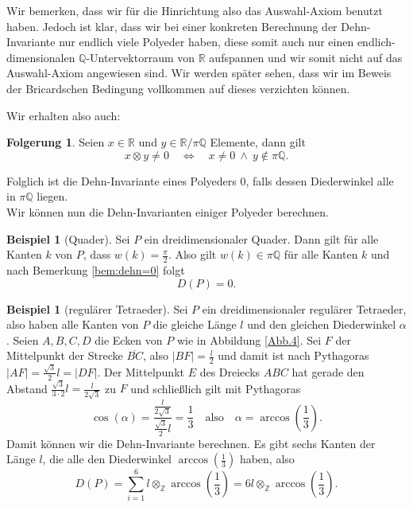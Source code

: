 \documentclass[11pt,titlepage]{article}
\newcommand{\setZ}{\mathbb{Z}}
\newcommand{\setQ}{\mathbb{Q}}
\newcommand{\setR}{\mathbb{R}}
\theoremstyle{definition}
\newtheorem{corollary}[theorem]{Folgerung}
\newtheorem{example}[theorem]{Beispiel}
\theoremstyle{remark}
\begin{document}
	Wir bemerken, dass wir für die Hinrichtung also das Auswahl-Axiom 
	benutzt haben. Jedoch ist klar, dass wir bei einer konkreten Berechnung der 
	Dehn-Invariante nur endlich viele Polyeder haben, diese somit auch 
	nur einen endlich-dimensionalen $\setQ$-Untervektorraum von $\setR$ aufspannen und wir somit nicht auf das Auswahl-Axiom angewiesen sind. Wir 
	werden später sehen, dass wir im Beweis der Bricardschen Bedingung 
	vollkommen auf dieses verzichten können.
	
	Wir erhalten also auch:
	
	\begin{corollary}
		Seien $x\in\setR$ und $y\in\setR/\pi\setQ$ Elemente, dann gilt
		\[ x\otimes y\neq0\quad\Leftrightarrow\quad x\neq 0 \ \land\ y\notin\pi\setQ. \]
	\end{corollary}
	
	Folglich ist die Dehn-Invariante eines Polyeders $0$, falls dessen Diederwinkel alle in $\pi\setQ$ liegen. \\
	
	Wir können nun die Dehn-Invarianten einiger Polyeder berechnen.
	
	\begin{example}[Quader] \label{exp:quader}
		Sei $P$ ein dreidimensionaler Quader. Dann gilt für alle Kanten $k$ von $P$, dass $w(k)=\frac{\pi}{2}$. 
		Also gilt $w(k)\in \pi\setQ$ für alle Kanten $k$ und nach Bemerkung \ref{bem:dehn=0} folgt
		\[ D(P)=0. \]
	\end{example}
	
	\begin{example}[regulärer Tetraeder] \label{exp:regTetr}
		Sei $P$ ein dreidimensionaler regulärer Tetraeder, also haben alle Kanten von $P$ die gleiche Länge $l$ und 
		den gleichen Diederwinkel $\alpha$. Seien $A,B,C,D$ die Ecken von $P$ wie in Abbildung \ref{Abb.4}. 
		Sei $F$ der Mittelpunkt der Strecke $\overline{BC}$, also $|BF|=\frac{l}{2}$ und damit ist nach Pythagoras 
		$|AF|=\frac{\sqrt{3}}{2}l=|DF|$. Der Mittelpunkt $E$ des Dreiecks $ABC$ hat gerade den Abstand 
		$\frac{\sqrt{3}}{3 \cdot 2}l=\frac{l}{2\sqrt{3}}$ zu $F$ und schließlich gilt mit Pythagoras
		\[\cos(\alpha)=\frac{\frac{l}{2\sqrt{3}}}{\frac{\sqrt{3}}{2}l}=\frac{1}{3}\quad\text{also}
		\quad \alpha=\arccos\left(\frac{1}{3}\right). \]
		Damit können wir die Dehn-Invariante berechnen. Es gibt sechs Kanten der Länge $l$, die alle den 
		Diederwinkel $\arccos\left(\frac{1}{3}\right)$ haben, also
		\[ D(P)=\sum_{i=1}^6 l\otimes_{\setZ}\arccos\left(\frac{1}{3}\right)=6l\otimes_{\setZ}\arccos\left(\frac{1}{3}\right).\]
	\end{example}
	
\end{document}
